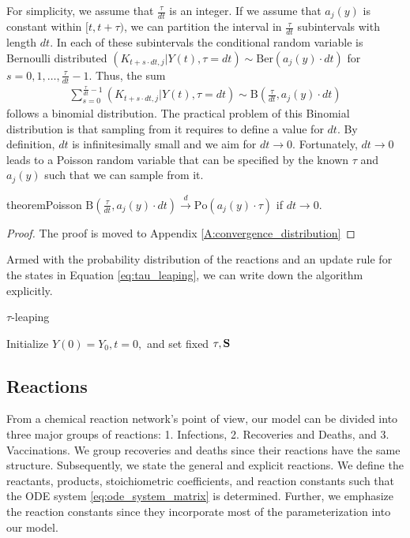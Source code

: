 For simplicity, we assume that $\frac{\tau}{dt}$ is an integer. If we assume that $a_j(y)$ is constant within $[t, t+\tau)$, we can partition the interval in $\frac{\tau}{dt}$ subintervals with length $dt$. In each of these subintervals the conditional random variable is Bernoulli distributed $\left(K_{t+s \cdot dt,j}|Y(t), \tau =dt\right) \sim \mathrm{Ber}(a_j(y) \cdot dt)$ for $s=0, 1, \dots, \frac{\tau}{dt} - 1$. Thus, the sum
\begin{align}
\sum_{s=0}^{\frac{\tau}{dt}-1} \left(K_{t+s \cdot dt, j} | Y(t), \tau = dt\right) \sim \textrm{B}\left(\frac{\tau}{dt}, a_j(y) \cdot dt\right)
\end{align}
follows a binomial distribution. The practical problem of this Binomial distribution is that sampling from it requires to define a value for $dt$. By definition, $dt$ is infinitesimally small and we aim for $dt \to 0$. Fortunately, $dt \to 0$ leads to a Poisson random variable that can be specified by the known $\tau$ and $a_j(y)$ such that we can sample from it.
\begin{restatable}{theorem}{Poisson}
$\textrm{B}\left(\frac{\tau}{dt}, a_j(y) \cdot dt\right) \xrightarrow{d} \textrm{Po}(a_j(y) \cdot \tau)$ if $dt \to 0$.
\end{restatable}
\begin{proof}
The proof is moved to Appendix \ref{A:convergence_distribution}
\end{proof}
Armed with the probability distribution of the reactions and an update rule for the states in Equation \eqref{eq:tau_leaping}, we can write down the algorithm explicitly. \\
\begin{algorithm}[H]
 \caption{$\tau$-leaping}
 \label{Algo:stochastic}
\SetAlgoLined
{}
 Initialize $Y(0) = Y_0, t=0,$ and set fixed $\tau, \mathbf{S}$\;

\end{algorithm}


\subsection{Reactions}
From a chemical reaction network's point of view, our model can be divided into three major groups of reactions: 1. Infections, 2. Recoveries and Deaths, and 3. Vaccinations. We group recoveries and deaths since their reactions have the same structure. Subsequently, we state the general and explicit reactions. We define the reactants, products, stoichiometric coefficients, and reaction constants such that the ODE system \eqref{eq:ode_system_matrix} is determined. Further, we emphasize the reaction constants since they incorporate most of the parameterization into our model.


